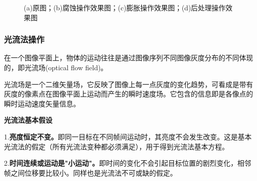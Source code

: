 \documentclass[11pt]{article}
\begin{document}
\begin{figure}[!h]
    \caption{(a)原图；(b)腐蚀操作效果图；(c)膨胀操作效果图；(d)后处理操作效果图}

\end{figure}

\subsubsection{光流法操作}
在一个图像平面上，物体的运动往往是通过图像序列不同图像灰度分布的不同体现的，即光流场(optical flow field)。

光流场是一个二维矢量场，它反映了图像上每一点灰度的变化趋势，可看成是带有灰度的像素点在图像平面上运动而产生的瞬时速度场。它包含的信息即是各像点的瞬时运动速度矢量信息。

\textbf{光流法基本假设}

1.\textbf{亮度恒定不变。}即同一目标在不同帧间运动时，其亮度不会发生改变。这是基本光流法的假定（所有光流法变种都必须满足），用于得到光流法基本方程。

2.\textbf{时间连续或运动是"小运动"。}即时间的变化不会引起目标位置的剧烈变化，相邻帧之间位移要比较小。同样也是光流法不可或缺的假定。
\end{document}
